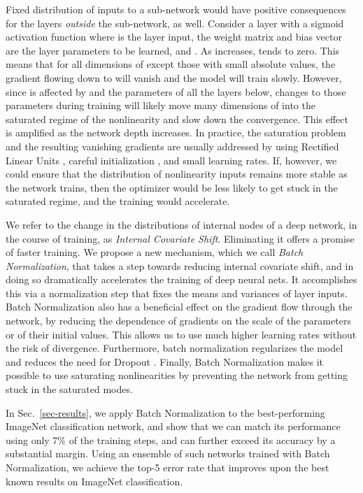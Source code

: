 \documentclass[twocolumn]{article}
\begin{document}
Fixed distribution of inputs to a sub-network would have positive
consequences for the layers {\em outside} the sub-network, as
well. Consider a layer with a sigmoid activation function  where  is the layer input, the weight matrix  and
bias vector  are the layer parameters to be learned, and . As  increases,  tends to zero. This
means that for all dimensions of  except those with
small absolute values, the gradient flowing down to  will vanish
and the model will train slowly. However, since  is affected by
 and the parameters of all the layers below, changes to those
parameters during training will likely move many dimensions of 
into the saturated regime of the nonlinearity and slow down the
convergence. This effect is amplified as the network depth
increases. In practice, the saturation problem and the resulting
vanishing gradients are usually addressed by using Rectified Linear
Units \cite{relu} , careful initialization
\cite{glorot-difficulty,iclr-dynamics}, and small learning rates.  If,
however, we could ensure that the distribution of nonlinearity inputs
remains more stable as the network trains, then the optimizer would be
less likely to get stuck in the saturated regime, and the training
would accelerate.

We refer to the change in the distributions of internal nodes of a
deep network, in the course of training, as {\em Internal Covariate Shift}. Eliminating it offers
a promise of faster training.  We propose a new mechanism, which we
call {\em Batch Normalization}, that takes a step towards reducing
internal covariate shift, and in doing so dramatically accelerates the
training of deep neural nets. It accomplishes this via a normalization
step that fixes the means and variances of layer inputs. Batch
Normalization also has a beneficial effect on the gradient flow
through the network, by reducing the dependence of gradients on the
scale of the parameters or of their initial values. This allows us to
use much higher learning rates without the risk of
divergence. Furthermore, batch normalization regularizes the model and
reduces the need for Dropout \cite{dropout}.  Finally, Batch
Normalization makes it possible to use saturating nonlinearities by
preventing the network from getting stuck in the saturated modes.

In Sec.~\ref{sec-results}, we apply Batch Normalization to the
best-performing ImageNet classification network, and show that we can
match its performance using only 7\% of the training steps, and can
further exceed its accuracy by a substantial margin.  Using an
ensemble of such networks trained with Batch Normalization, we achieve
the top-5 error rate that improves upon the best known results on
ImageNet classification.
\end{document}
